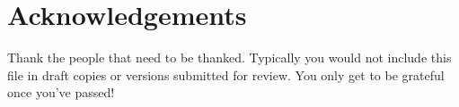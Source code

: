 \newpage
\thispagestyle{plain}
\chapter*{Acknowledgements}

Thank the people that need to be thanked. Typically you would not include this
file in draft copies or versions submitted for review. You only get to be
grateful once you've passed!

\cleardoublepage
